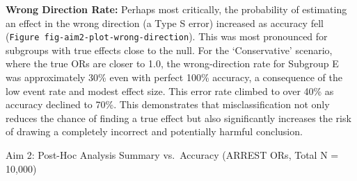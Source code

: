 \documentclass[
  letterpaper,
  DIV=11,
  numbers=noendperiod]{scrartcl}
\begin{document}
\textbf{Wrong Direction Rate:} Perhaps most critically, the probability
of estimating an effect in the wrong direction (a Type S error)
increased as accuracy fell
(\texttt{Figure\ fig-aim2-plot-wrong-direction}). This was most
pronounced for subgroups with true effects close to the null. For the
`Conservative' scenario, where the true ORs are closer to 1.0, the
wrong-direction rate for Subgroup E was approximately 30\% even with
perfect 100\% accuracy, a consequence of the low event rate and modest
effect size. This error rate climbed to over 40\% as accuracy declined
to 70\%. This demonstrates that misclassification not only reduces the
chance of finding a true effect but also significantly increases the
risk of drawing a completely incorrect and potentially harmful
conclusion.

\begin{table}

\caption{\label{tbl-aim2-table-summary}Aim 2: Post-Hoc Analysis Summary
vs.~Accuracy (ARREST ORs, Total N = 10,000)}

\centering{

}
\end{table}
\end{document}
